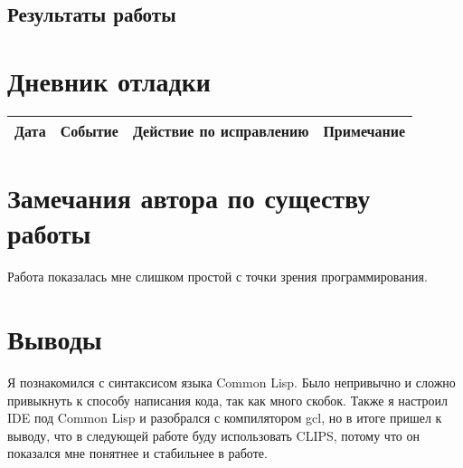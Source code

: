 \documentclass[12pt]{article}
\begin{document}
\pagebreak
\subsection{Результаты работы}


\pagebreak
\section{Дневник отладки}
\begin{tabular}{|p{50pt}|p{80pt}|p{140pt}|p{140pt}|}
\hline
Дата & Событие & Действие по исправлению & Примечание \\
\hline
\end{tabular}

\section{Замечания автора по существу работы}
Работа показалась мне слишком простой с точки зрения программирования.


\section{Выводы}
Я познакомился с синтаксисом языка Common Lisp. Было непривычно и сложно привыкнуть к способу написания кода, так как много скобок. Также я настроил IDE под Common Lisp и разобрался с компилятором gcl, но в итоге пришел к выводу, что в следующей работе буду использовать CLIPS, потому что он показался мне понятнее и стабильнее в работе.
\end{document}
